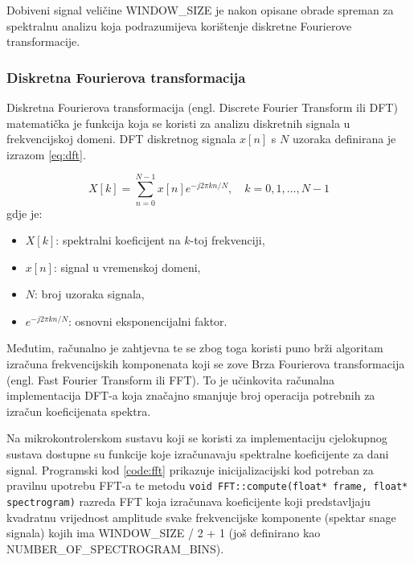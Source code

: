 Dobiveni signal veličine WINDOW\_SIZE je nakon opisane obrade spreman za spektralnu analizu
koja podrazumijeva korištenje diskretne Fourierove transformacije.

\subsubsection{Diskretna Fourierova transformacija}
\label{sec:fft}

Diskretna Fourierova transformacija (engl. Discrete Fourier Transform ili DFT) matematička je
funkcija koja se koristi za analizu diskretnih signala u frekvencijskoj domeni. 
DFT diskretnog signala \( x[n] \) s \( N \) uzoraka definirana je izrazom \ref{eq:dft}.

\begin{equation}
    X[k] = \sum_{n=0}^{N-1} x[n] e^{-j 2 \pi k n / N}, \quad k = 0, 1, \dots, N-1
\end{equation}
\label{eq:dft}
gdje je:
\begin{itemize}
    \item \( X[k] \): spektralni koeficijent na \( k \)-toj frekvenciji,
    \item \( x[n] \): signal u vremenskoj domeni,
    \item \( N \): broj uzoraka signala,
    \item \( e^{-j 2 \pi k n / N} \): osnovni eksponencijalni faktor.
\end{itemize}

Međutim, računalno je zahtjevna te se zbog toga koristi puno brži algoritam izračuna
frekvencijskih komponenata koji se zove Brza Fourierova transformacija (engl. Fast Fourier
Transform ili FFT). To je učinkovita računalna implementacija DFT-a koja značajno smanjuje
broj operacija potrebnih za izračun koeficijenata spektra.

Na mikrokontrolerskom sustavu koji se koristi za implementaciju cjelokupnog sustava
dostupne su funkcije koje izračunavaju spektralne koeficijente za dani signal. 
Programski kod \ref{code:fft} prikazuje inicijalizacijski kod potreban za pravilnu 
upotrebu FFT-a te metodu \texttt{void FFT::compute(float* frame, float* spectrogram)} 
razreda FFT koja izračunava koeficijente koji predstavljaju kvadratnu vrijednost
amplitude svake frekvencijske komponente (spektar snage signala) kojih ima 
WINDOW\_SIZE / 2 + 1 (još definirano kao NUMBER\_OF\_SPECTROGRAM\_BINS). 


